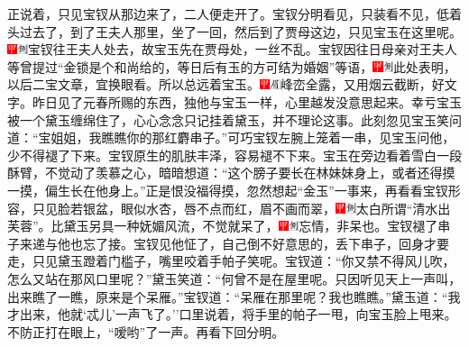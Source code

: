 正说着，只见宝钗从那边来了，二人便走开了。宝钗分明看见，只装看不见，低着头过去了，到了王夫人那里，坐了一回，然后到了贾母这边，只见宝玉在这里呢。{\includegraphics[width=3mm]{../Images/00002}\includegraphics[width=3mm]{../Images/00011}\footnotesize \kaishu 宝钗往王夫人处去，故宝玉先在贾母处，一丝不乱。}宝钗因往日母亲对王夫人等曾提过``金锁是个和尚给的，等日后有玉的方可结为婚姻''等语，{\includegraphics[width=3mm]{../Images/00002}\includegraphics[width=3mm]{../Images/00011}\footnotesize \kaishu 此处表明，以后二宝文章，宜换眼看。}所以总远着宝玉。{\includegraphics[width=3mm]{../Images/00002}\includegraphics[width=3mm]{../Images/00010}\footnotesize \kaishu 峰峦全露，又用烟云截断，好文字。}昨日见了元春所赐的东西，独他与宝玉一样，心里越发没意思起来。幸亏宝玉被一个黛玉缠绵住了，心心念念只记挂着黛玉，并不理论这事。此刻忽见宝玉笑问道：``宝姐姐，我瞧瞧你的那红麝串子。''可巧宝钗左腕上笼着一串，见宝玉问他，少不得褪了下来。宝钗原生的肌肤丰泽，容易褪不下来。宝玉在旁边看着雪白一段酥臂，不觉动了羡慕之心，暗暗想道：``这个膀子要长在林妹妹身上，或者还得摸一摸，偏生长在他身上。''正是恨没福得摸，忽然想起``金玉''一事来，再看看宝钗形容，只见脸若银盆，眼似水杏，唇不点而红，眉不画而翠，{\includegraphics[width=3mm]{../Images/00002}\includegraphics[width=3mm]{../Images/00011}\footnotesize \kaishu 太白所谓``清水出芙蓉''。}比黛玉另具一种妩媚风流，不觉就呆了，{\includegraphics[width=3mm]{../Images/00002}\includegraphics[width=3mm]{../Images/00011}\footnotesize \kaishu 忘情，非呆也。}宝钗褪了串子来递与他也忘了接。宝钗见他怔了，自己倒不好意思的，丢下串子，回身才要走，只见黛玉蹬着门槛子，嘴里咬着手帕子笑呢。宝钗道：``你又禁不得风儿吹，怎么又站在那风口里呢？''黛玉笑道：``何曾不是在屋里呢。只因听见天上一声叫，出来瞧了一瞧，原来是个呆雁。''宝钗道：``呆雁在那里呢？我也瞧瞧。''黛玉道：``我才出来，他就`忒儿'一声飞了。''口里说着，将手里的帕子一甩，向宝玉脸上甩来。不防正打在眼上，``嗳哟''了一声。再看下回分明。

